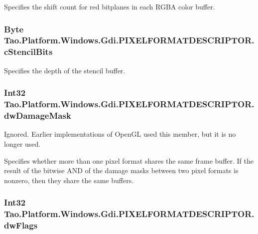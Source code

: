 Specifies the shift count for red bitplanes in each RGBA color buffer. 

\hypertarget{struct_tao_1_1_platform_1_1_windows_1_1_gdi_1_1_p_i_x_e_l_f_o_r_m_a_t_d_e_s_c_r_i_p_t_o_r_a09f40e25a8edadd1c3e20feae9899113}{
\subsubsection[{cStencilBits}]{\setlength{\rightskip}{0pt plus 5cm}Byte {\bf Tao.Platform.Windows.Gdi.PIXELFORMATDESCRIPTOR.cStencilBits}}}
\label{struct_tao_1_1_platform_1_1_windows_1_1_gdi_1_1_p_i_x_e_l_f_o_r_m_a_t_d_e_s_c_r_i_p_t_o_r_a09f40e25a8edadd1c3e20feae9899113}


Specifies the depth of the stencil buffer. 

\hypertarget{struct_tao_1_1_platform_1_1_windows_1_1_gdi_1_1_p_i_x_e_l_f_o_r_m_a_t_d_e_s_c_r_i_p_t_o_r_a24eb16cff0e49e7f052163afbc149f89}{
\subsubsection[{dwDamageMask}]{\setlength{\rightskip}{0pt plus 5cm}Int32 {\bf Tao.Platform.Windows.Gdi.PIXELFORMATDESCRIPTOR.dwDamageMask}}}
\label{struct_tao_1_1_platform_1_1_windows_1_1_gdi_1_1_p_i_x_e_l_f_o_r_m_a_t_d_e_s_c_r_i_p_t_o_r_a24eb16cff0e49e7f052163afbc149f89}


Ignored. Earlier implementations of OpenGL used this member, but it is no longer used. 

Specifies whether more than one pixel format shares the same frame buffer. If the result of the bitwise AND of the damage masks between two pixel formats is nonzero, then they share the same buffers. \hypertarget{struct_tao_1_1_platform_1_1_windows_1_1_gdi_1_1_p_i_x_e_l_f_o_r_m_a_t_d_e_s_c_r_i_p_t_o_r_af5fb7fa704eb45ea26aad410ab299f66}{
\subsubsection[{dwFlags}]{\setlength{\rightskip}{0pt plus 5cm}Int32 {\bf Tao.Platform.Windows.Gdi.PIXELFORMATDESCRIPTOR.dwFlags}}}
\label{struct_tao_1_1_platform_1_1_windows_1_1_gdi_1_1_p_i_x_e_l_f_o_r_m_a_t_d_e_s_c_r_i_p_t_o_r_af5fb7fa704eb45ea26aad410ab299f66}


